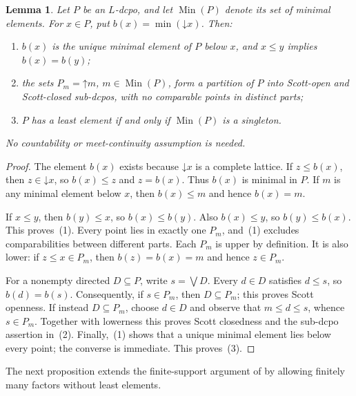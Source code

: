 \documentclass[11pt,reqno]{amsart}
\newtheorem{lemma}[theorem]{Lemma}
\theoremstyle{definition}
\theoremstyle{remark}
\numberwithin{equation}{section}
\newcommand{\down}[1]{\mathord{\downarrow}#1}
\newcommand{\up}[1]{\mathord{\uparrow}#1}
\begin{document}
\begin{lemma}\label{lem:minimal-component-decomposition}
Let $P$ be an $L$-dcpo, and let $\operatorname{Min}(P)$ denote its set of minimal elements. For $x\in P$, put $b(x)=\min(\down x)$. Then:
\begin{enumerate}[label=\textup{(\arabic*)}]
\item $b(x)$ is the unique minimal element of $P$ below $x$, and $x\le y$ implies $b(x)=b(y)$;
\item the sets $P_m=\up m$, $m\in\operatorname{Min}(P)$, form a partition of $P$ into Scott-open and Scott-closed sub-dcpos, with no comparable points in distinct parts;
\item $P$ has a least element if and only if $\operatorname{Min}(P)$ is a singleton.
\end{enumerate}
No countability or meet-continuity assumption is needed.
\end{lemma}
\begin{proof}
The element $b(x)$ exists because $\down x$ is a complete lattice. If $z\le b(x)$, then $z\in\down x$, so $b(x)\le z$ and $z=b(x)$. Thus $b(x)$ is minimal in $P$. If $m$ is any minimal element below $x$, then $b(x)\le m$ and hence $b(x)=m$.

If $x\le y$, then $b(y)\le x$, so $b(x)\le b(y)$. Also $b(x)\le y$, so $b(y)\le b(x)$. This proves~(1). Every point lies in exactly one $P_m$, and~(1) excludes comparabilities between different parts. Each $P_m$ is upper by definition. It is also lower: if $z\le x\in P_m$, then $b(z)=b(x)=m$ and hence $z\in P_m$.

For a nonempty directed $D\subseteq P$, write $s=\bigvee D$. Every $d\in D$ satisfies $d\le s$, so $b(d)=b(s)$. Consequently, if $s\in P_m$, then $D\subseteq P_m$; this proves Scott openness. If instead $D\subseteq P_m$, choose $d\in D$ and observe that $m\le d\le s$, whence $s\in P_m$. Together with lowerness this proves Scott closedness and the sub-dcpo assertion in~(2). Finally,~(1) shows that a unique minimal element lies below every point; the converse is immediate. This proves~(3).
\end{proof}

The next proposition extends the finite-support argument of \cite[Section~5]{XuJi} by allowing finitely many factors without least elements.
\end{document}
